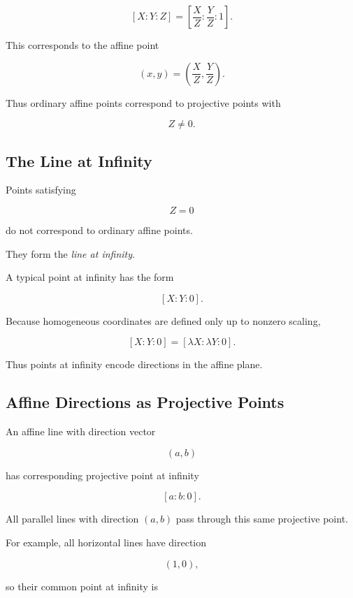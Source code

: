\[
[X:Y:Z]
=
\left[
\frac{X}{Z}:
\frac{Y}{Z}:
1
\right].
\]

This corresponds to the affine point

\[
\boxed{
(x,y)=
\left(
\frac{X}{Z},
\frac{Y}{Z}
\right).
}
\]

Thus ordinary affine points correspond to projective points with

\[
Z\neq0.
\]

\subsection{The Line at Infinity}
\label{subsec:line-at-infinity}

Points satisfying

\[
\boxed{Z=0}
\]

do not correspond to ordinary affine points.

They form the \emph{line at infinity}.

A typical point at infinity has the form

\[
[X:Y:0].
\]

Because homogeneous coordinates are defined only up to nonzero scaling,

\[
[X:Y:0]
=
[\lambda X:\lambda Y:0].
\]

Thus points at infinity encode directions in the affine plane.

\subsection{Affine Directions as Projective Points}
\label{subsec:affine-directions-projective}

An affine line with direction vector

\[
(a,b)
\]

has corresponding projective point at infinity

\[
\boxed{[a:b:0].}
\]

All parallel lines with direction \((a,b)\) pass through this same
projective point.

For example, all horizontal lines have direction

\[
(1,0),
\]

so their common point at infinity is

